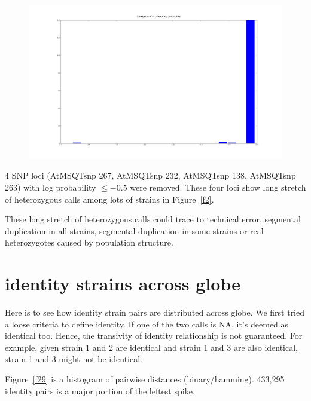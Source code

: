 \documentclass[a4paper,10pt]{article}
\begin{document}
\begin{figure}
\includegraphics[width=1\textwidth]{figures/data_d110_c0_5_SNP_locus_log_prob.png}
\caption{}\label{f3}
\end{figure}

4 SNP loci (AtMSQTsnp 267, AtMSQTsnp 232, AtMSQTsnp 138, AtMSQTsnp 263) with log probability $\leq -0.5$ were removed. These four loci show long stretch of heterozygous calls among lots of strains in Figure~\ref{f2}.

These long stretch of heterozygous calls could trace to technical error, segmental duplication in all strains, segmental duplication in some strains  or real heterozygotes caused by population structure.


\section{identity strains across globe}
Here is to see how identity strain pairs are distributed across globe. We first tried a loose criteria to define identity. If one of the two calls is NA, it's deemed as identical too. Hence, the transivity of identity relationship is not guaranteed. For example, given strain 1 and 2 are identical and strain 1 and 3 are also identical, strain 1 and 3 might not be identical.

Figure~\ref{f29} is a histogram of pairwise distances (binary/hamming). 433,295 identity pairs is a major portion of the leftest spike.
\end{document}
